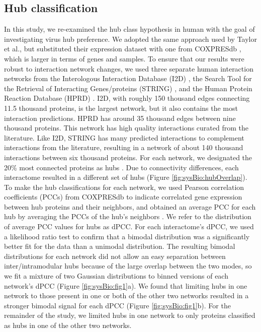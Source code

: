 \subsection{Hub classification}

In this study, we re-examined the hub class hypothesis in human with
the goal of investigating virus hub preference. We adopted the same
approach used by Taylor et al., but substituted their expression
dataset with one from COXPRESdb \cite{obayashi07}, which is larger in
terms of genes and samples. To ensure that our results were robust to
interaction network changes, we used three separate human interaction
networks from the Interologous Interaction Database (I2D)
\cite{brown05}, the Search Tool for the Retrieval of Interacting
Genes/proteins (STRING) \cite{von07}, and the Human Protein Reaction
Database (HPRD) \cite{prasad08}. I2D, with roughly 150 thousand edges
connecting 11.5 thousand proteins, is the largest network, but it also
contains the most interaction predictions. HPRD has around 35 thousand
edges between nine thousand proteins. This network has high quality
interactions curated from the literature. Like I2D, STRING has many
predicted interactions to complement interactions from the literature,
resulting in a network of about 140 thousand interactions between six
thousand proteins. For each network, we designated the 20\% most
connected proteins as hubs \cite{bertin07}. Due to connectivity
differences, each interactome resulted in a different set of hubs
(Figure \ref{fig:sysBio:hubOverlap}). To make the hub classifications
for each network, we used Pearson correlation coefficients (PCCs) from
COXPRESdb to indicate correlated gene expression between hub proteins
and their neighbors, and obtained an average PCC for each hub by
averaging the PCCs of the hub's neighbors \cite{han04,taylor09}. We
refer to the distribution of average PCC values for hubs as dPCC. For
each interactome's dPCC, we used a likelihood ratio test
\cite{ertel08} to confirm that a bimodal distribution was a
significantly better fit for the data than a unimodal
distribution. The resulting bimodal distributions for each network did
not allow an easy separation between inter/intramodular hubs because
of the large overlap between the two modes, so we fit a mixture of two
Gaussian distributions to binned versions of each network's dPCC
(Figure \ref{fig:sysBio:fig1}a). We found that limiting hubs in one
network to those present in one or both of the other two networks
resulted in a stronger bimodal signal for each dPCC (Figure
\ref{fig:sysBio:fig1}b). For the remainder of the study, we limited
hubs in one network to only proteins classified as hubs in one of the
other two networks.

